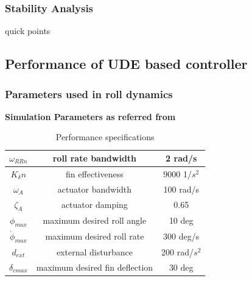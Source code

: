 \documentclass[table,10pt,red]{beamer}	%
\begin{document}
\begin{frame}
\frametitle{Stability Analysis}

quick points

\end{frame}


\subsection{Performance of UDE based controller}
\begin{frame}
\frametitle{Parameters used in roll dynamics}
\textbf{Simulation Parameters as referred from \cite{talole2011}}
%
\begin{table}[h]
\begin{center}
\caption{Performance specifications}\label{tb1}
\begin{tabular}{ccc}
\hline
$\omega_{RRn}$ & roll rate bandwidth & 2 rad/s\\ \hline
$K_\delta n$ & fin effectiveness & 9000 1/$s^2$\\ \hline
$\omega_A$ & actuator bandwidth & 100 rad/s\\ \hline
$\zeta_A$ & actuator damping & 0.65 \\ \hline
$\phi_{max}$ & maximum desired roll angle & 10 deg\\ \hline
$\dot{\phi}_{max}$ & maximum desired roll rate & 300 deg/s\\ \hline
$d_{ext}$ & external disturbance & 200 rad/$s^2$ \\ \hline
$\delta_{cmax}$ & maximum desired fin deflection & 30 deg \\ \hline


\end{tabular}
\end{center}
\end{table}
\end{frame}
\end{document}
